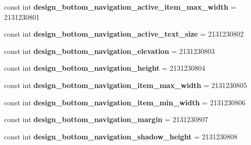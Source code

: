 \begin{DoxyCompactItemize}
\mbox{\label{classst_delivery_1_1_resource_1_1_dimension_ab41e004b2db7e1a39ec53adf9d6d4838}} 
const int {\bfseries design\+\_\+bottom\+\_\+navigation\+\_\+active\+\_\+item\+\_\+max\+\_\+width} = 2131230801
\item 
\mbox{\label{classst_delivery_1_1_resource_1_1_dimension_af17847315d8dafb9b1a31c407994a1d4}} 
const int {\bfseries design\+\_\+bottom\+\_\+navigation\+\_\+active\+\_\+text\+\_\+size} = 2131230802
\item 
\mbox{\label{classst_delivery_1_1_resource_1_1_dimension_ab39d831aff592cdc955537af65ad97b4}} 
const int {\bfseries design\+\_\+bottom\+\_\+navigation\+\_\+elevation} = 2131230803
\item 
\mbox{\label{classst_delivery_1_1_resource_1_1_dimension_abec026858d703bdb9fd4952509fb824d}} 
const int {\bfseries design\+\_\+bottom\+\_\+navigation\+\_\+height} = 2131230804
\item 
\mbox{\label{classst_delivery_1_1_resource_1_1_dimension_ae77853da63e434c5d3935212e37b9c53}} 
const int {\bfseries design\+\_\+bottom\+\_\+navigation\+\_\+item\+\_\+max\+\_\+width} = 2131230805
\item 
\mbox{\label{classst_delivery_1_1_resource_1_1_dimension_a088276e5f0618e5f104a506bc4ad9b9d}} 
const int {\bfseries design\+\_\+bottom\+\_\+navigation\+\_\+item\+\_\+min\+\_\+width} = 2131230806
\item 
\mbox{\label{classst_delivery_1_1_resource_1_1_dimension_a54b9f4f6f33a39c91aa106bcd45541ed}} 
const int {\bfseries design\+\_\+bottom\+\_\+navigation\+\_\+margin} = 2131230807
\item 
\mbox{\label{classst_delivery_1_1_resource_1_1_dimension_a646833902665d965114993402d3018f8}} 
const int {\bfseries design\+\_\+bottom\+\_\+navigation\+\_\+shadow\+\_\+height} = 2131230808
\item 

\end{DoxyCompactItemize}
